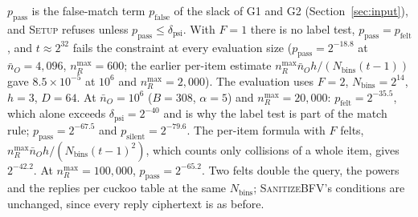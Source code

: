 $p_{\mathrm{pass}}$ is the false-match term $p_{\mathrm{false}}$ of the slack of G1 and G2 (Section~\ref{sec:input}), and \textsc{Setup} refuses unless $p_{\mathrm{pass}} \le \delta_{\mathrm{psi}}$. With $F = 1$ there is no label test, $p_{\mathrm{pass}} = p_{\mathrm{felt}}$, and $t \approx 2^{32}$ fails the constraint at every evaluation size ($p_{\mathrm{pass}} = 2^{-18.8}$ at $\bar n_O = 4{,}096$, $n_R^{\max} = 600$; the earlier per-item estimate $n_R^{\max}\bar n_O h/(N_{\mathrm{bins}}(t-1))$ gave $8.5 \times 10^{-5}$ at $10^6$ and $n_R^{\max} = 2{,}000$). The evaluation uses $F = 2$, $N_{\mathrm{bins}} = 2^{14}$, $h = 3$, $D = 64$. At $\bar n_O = 10^6$ ($B = 308$, $\alpha = 5$) and $n_R^{\max} = 20{,}000$: $p_{\mathrm{felt}} = 2^{-35.5}$, which alone exceeds $\delta_{\mathrm{psi}} = 2^{-40}$ and is why the label test is part of the match rule; $p_{\mathrm{pass}} = 2^{-67.5}$ and $p_{\mathrm{silent}} = 2^{-79.6}$. The per-item formula with $F$ felts, $n_R^{\max}\bar n_O h/(N_{\mathrm{bins}}(t-1)^2)$, which counts only collisions of a whole item, gives $2^{-42.2}$. At $n_R^{\max} = 100{,}000$, $p_{\mathrm{pass}} = 2^{-65.2}$. Two felts double the query, the powers and the replies per cuckoo table at the same $N_{\mathrm{bins}}$; \textsc{SanitizeBFV}'s conditions are unchanged, since every reply ciphertext is as before.

